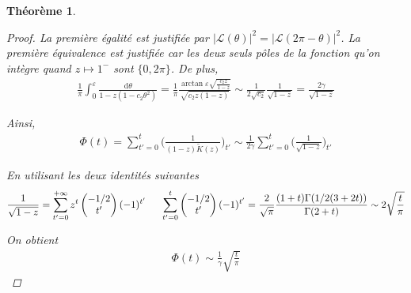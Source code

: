 \documentclass{article}
\newtheorem{theorem}{Théorème}[section]
\theoremstyle{definition}
\begin{document}
\begin{theorem}
\begin{proof}
La première égalité est justifiée par $|\mathcal{L}(\theta)|^2 = |\mathcal{L}(2\pi-\theta)|^2$. La première équivalence est justifiée car les deux seuls pôles de la fonction qu'on intègre quand $z\mapsto 1^{-}$ sont $\{0,2\pi\}$.
De plus,
\begin{align*}
	\frac{1}{\pi}\int_{0}^{\varepsilon}\frac{\mathrm{d}\theta}{1-z(1-c_2\theta^2)} = \frac{1}{\pi}\frac{\arctan\varepsilon\sqrt{\frac{c_2 z}{1-z}}}{\sqrt{c_2 z (1-z)}} \sim \frac{1}{2\sqrt{c_2}}\frac{1}{\sqrt{1-z}} = \frac{2\gamma}{\sqrt{1-z}}
\end{align*}

Ainsi, \begin{align*}
	\Phi(t) = \sum_{t'=0}^t \bigg(\frac{1}{(1-z)\tilde{K}(z)}\bigg)_{t'} \sim \frac{1}{2\gamma} \sum_{t'=0}^t \bigg(\frac{1}{\sqrt{1-z}}\bigg)_{t'}
\end{align*}

En utilisant les deux identités suivantes \begin{align*}
	\frac{1}{\sqrt{1-z}} = \sum_{t'=0}^{+\infty} z^t \begin{pmatrix}-1/2 \\ t'\end{pmatrix}(-1)^{t'} \indent \sum_{t'=0}^t \begin{pmatrix}-1/2\\t'\end{pmatrix} (-1)^{t'} = \frac{2}{\sqrt{\pi}} \frac{(1+t)\Gamma(1/2(3+2t))}{\Gamma(2+t)} \sim 2\sqrt{\frac{t}{\pi}}
\end{align*}

On obtient \begin{align*}
	\Phi(t) \sim \frac{1}{\gamma}\sqrt{\frac{t}{\pi}} 
\end{align*}



\end{proof}
\end{theorem}
\end{document}
